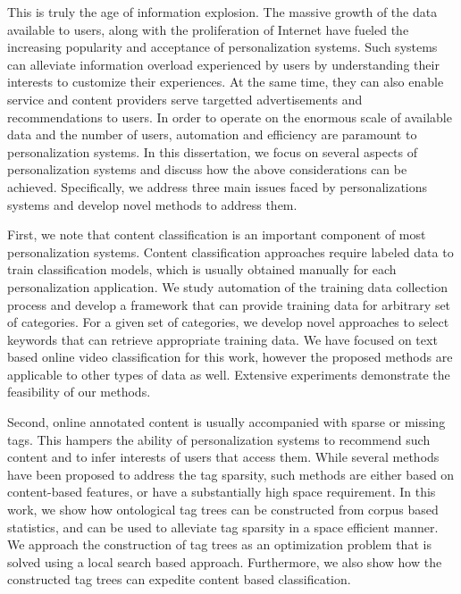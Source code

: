 \documentclass[12pt]{ucsddissertation}
\begin{document}
\begin{dissertationabstract}



This is truly the age of information explosion. The massive growth of the data available to users, along with the proliferation of Internet have fueled the increasing popularity and acceptance of personalization systems. Such systems can alleviate information overload experienced by users by understanding their interests to customize their experiences. At the same time, they can also enable service and content providers serve targetted advertisements and recommendations to users. In order to operate on the enormous scale of available data and the number of users, automation and efficiency are paramount to personalization systems. In this dissertation, we focus on several aspects of personalization systems and discuss how the above considerations can be achieved. Specifically, we address three main issues faced by personalizations systems and develop novel methods to address them. 

First, we note that content classification is an important component of most personalization systems. Content classification approaches require labeled data to train classification models, which is usually obtained manually for each personalization application. We study automation of the training data collection process and develop a framework that can provide training data for arbitrary set of categories. For a given set of categories, we develop novel approaches to select keywords that can retrieve appropriate training data. We have focused on text based online video classification for this work, however the proposed methods are applicable to other types of data as well. Extensive experiments demonstrate the feasibility of our methods. 

Second, online annotated content is usually accompanied with sparse or missing tags. This hampers the ability of personalization systems to recommend such content and to infer interests of users that access them. While several methods have been proposed to address the tag sparsity, such methods are either based on content-based features, or have a substantially high space requirement. In this work, we show how ontological tag trees can be constructed from corpus based statistics, and can be used to alleviate tag sparsity in a space efficient manner. We approach the construction of tag trees as an optimization problem that is solved using a local search based approach. Furthermore, we also show how the constructed tag trees can expedite content based classification. 


\end{dissertationabstract}
\end{document}
